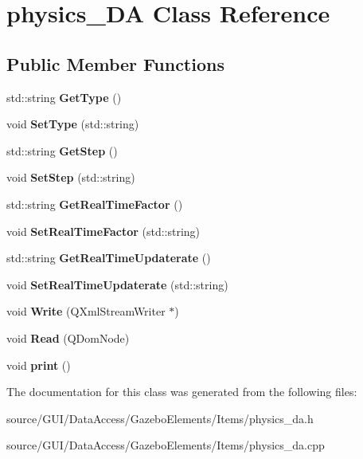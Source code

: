 \section{physics\+\_\+\+DA Class Reference}
\label{classphysics___d_a}
\subsection*{Public Member Functions}
\begin{DoxyCompactItemize}
\item 
std\+::string {\bfseries Get\+Type} ()\label{classphysics___d_a_a15011cf6136b49183605dbbbecd1ae5e}

\item 
void {\bfseries Set\+Type} (std\+::string)\label{classphysics___d_a_a36a3b92dbc5bb7c9e33f609c8f9be6b9}

\item 
std\+::string {\bfseries Get\+Step} ()\label{classphysics___d_a_a37416daf18f2a78ea219d06a11e2a5ea}

\item 
void {\bfseries Set\+Step} (std\+::string)\label{classphysics___d_a_ab8cc82fa380eaaa7effbd4b5aa1128fc}

\item 
std\+::string {\bfseries Get\+Real\+Time\+Factor} ()\label{classphysics___d_a_a5688f0252b5711cc4f835ef2000fcb04}

\item 
void {\bfseries Set\+Real\+Time\+Factor} (std\+::string)\label{classphysics___d_a_a2b32e4a2a943652fae128ad267e0af57}

\item 
std\+::string {\bfseries Get\+Real\+Time\+Updaterate} ()\label{classphysics___d_a_a457178e5af8bd9e063d1974286e31710}

\item 
void {\bfseries Set\+Real\+Time\+Updaterate} (std\+::string)\label{classphysics___d_a_a2c6ab3f83458e80b4c16fc282c1250be}

\item 
void {\bfseries Write} (Q\+Xml\+Stream\+Writer $\ast$)\label{classphysics___d_a_a05257519cfe27983fb0fecf250672665}

\item 
void {\bfseries Read} (Q\+Dom\+Node)\label{classphysics___d_a_a415b11b4f1e969045fe74ff92cace253}

\item 
void {\bfseries print} ()\label{classphysics___d_a_a1510c2a8e13959a19efb78b0e5d28ae3}

\end{DoxyCompactItemize}


The documentation for this class was generated from the following files\+:\begin{DoxyCompactItemize}
\item 
source/\+G\+U\+I/\+Data\+Access/\+Gazebo\+Elements/\+Items/physics\+\_\+da.\+h\item 
source/\+G\+U\+I/\+Data\+Access/\+Gazebo\+Elements/\+Items/physics\+\_\+da.\+cpp\end{DoxyCompactItemize}
